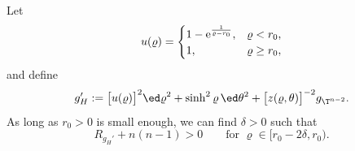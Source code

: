 \begin{Lemma}\label{tradeoffLemma}
Let
\begin{equation}
u(\varrho)=
		\begin{cases}
			1-{\rm e}^{\frac{1}{\varrho-r_0}},& \varrho< r_0, \\
		    1, & \varrho\geq r_0,
		\end{cases}
\end{equation}
and define
\begin{equation*}%
g_{H}':=\bigl[u(\varrho)\bigr]^2\ed\varrho^2 +\sinh^2 \varrho\, \ed\theta^2 +\bigl[z(\varrho,\theta)\bigr]^{-2} g_{\T^{n-2}}.
\end{equation*}
As long as $r_0>0$ is small enough, we can find $\delta>0$ such that
\[
	R_{g_{H}'} + n(n-1)  >0\qquad \mbox{for }
 \varrho \in [r_0-2\delta, r_0).
\]
\end{Lemma}

